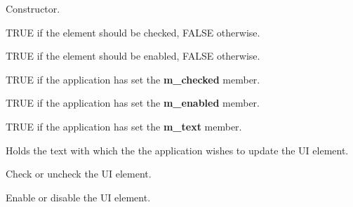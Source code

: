 




Constructor.



TRUE if the element should be checked, FALSE otherwise.



TRUE if the element should be enabled, FALSE otherwise.



TRUE if the application has set the {\bf m\_checked} member.



TRUE if the application has set the {\bf m\_enabled} member.



TRUE if the application has set the {\bf m\_text} member.



Holds the text with which the the application wishes to
update the UI element.

\label{wxupdateuieventcheck}


Check or uncheck the UI element.

\label{wxupdateuieventenable}


Enable or disable the UI element.

\label{wxupdateuieventgetchecked}

